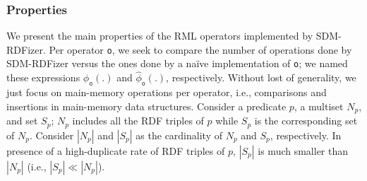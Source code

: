 \subsubsection{Properties} 
We present the main properties of the RML operators implemented by SDM-RDFizer. Per operator \texttt{o}, we seek to compare the number of operations done by SDM-RDFizer versus the ones done by a na\"ive implementation of \texttt{o}; we named these expressions $\phi_{\texttt{o}}(.)$ and $\widehat{\phi}_{\texttt{o}}(.)$, respectively. Without lost of generality, we just focus on main-memory operations per operator, i.e., comparisons and insertions in main-memory data structures. Consider a predicate $p$, a multiset $N_p$, and set $S_p$; $N_p$ includes all the RDF triples of $p$ while $S_p$ is the corresponding set of $N_p$. Consider $|N_p|$ and $|S_p|$ as the cardinality of $N_p$ and $S_p$, respectively. In presence of a high-duplicate rate of RDF triples of $p$, $|S_p|$ is much smaller than $|N_p|$ (i.e., $|S_p| \ll|N_p|$).
